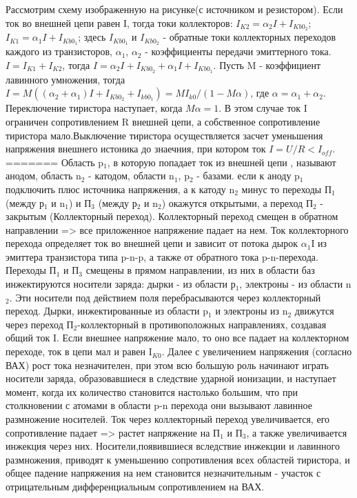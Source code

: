 Рассмотрим схему изображенную на рисунке(с источником и резистором). Если ток во внешней цепи равен I, тогда токи коллекторов:
$I_{K2} = \alpha_2I+I_{Kb0}_2$; $I_{K1} = \alpha_1I+I_{Kb0}_1$;
здесь $I_{Kb0}_1$ и $I_{Kb0}_2$ - обратные токи коллекторных переходов каждого из транзисторов, $\alpha_1$, $\alpha_2$ - коэффициенты передачи эмиттерного тока. $I = I_{K1}+I_{K2}$, тогда  $I = \alpha_2I+I_{Kb0}_2+\alpha_1I+I_{Kb0}_1$.
Пусть M - коэффициент лавинного умножения, тогда $I = M( (\alpha_2+\alpha_1)I+I_{Kb0}_2+I_{kb0}_1) = MI_{k0}/(1-M\alpha) $, где $\alpha = \alpha_1+\alpha_2$. Переключение тиристора наступает, когда $M\alpha = 1$. В этом случае ток I ограничен сопротивлением R внешней цепи, а собственное сопротивление тиристора мало.Выключение тиристора осуществляется засчет уменьшения напряжения внешнего истоника до знаечния, при котором ток $I=U/R < I_{off}$.
=======
Область p$_1$, в которую попадает ток из внешней цепи , называют анодом, область n$_2$  - катодом, области n$_1$, p$_2$ - базами. если к аноду p$_1$ подключить плюс источника напряжения, а к катоду n$_2$ минус то переходы П$_1$ (между р$_1$ и n$_1$) и  П$_3$ (между р$_2$ и n$_2$) окажутся открытыми, а переход П$_2$ - закрытым (Коллекторный переход). Коллекторный переход смещен в обратном направлении => все приложенное напряжение падает на нем. Ток коллекторного перехода определяет ток во внешней цепи и зависит от потока дырок $\alpha_1$I из эмиттера транзистора типа p-n-p, а также от обратного тока p-n-перехода. Переходы П$_1$ и П$_3$ смещены в прямом направлении, из них в области баз инжектируются носители заряда: дырки - из области р$_1$, электроны - из области n$_2$. Эти носители под действием поля перебрасываются через коллекторный переход. Дырки, инжектированные из области p$_1$ и электроны из n$_2$ движутся через переход П$_2$-коллекторный в противоположных направлениях, создавая общий ток I. Если внешнее напряжение мало, то оно все падает на коллекторном переходе, ток в цепи мал и равен I$_{K0}$. Далее с увеличением напряжения (согласно ВАХ) рост тока незначителен, при этом всю большую роль начинают играть носители заряда, образовавшиеся в следствие ударной ионизации, и наступает момент, когда их количество становится настолько большим, что при столкновении с атомами в области p-n перехода они вызывают лавинное размножение носителей. Ток через коллекторный переход увеличивается, его сопротивление падает => растет напряжение на П$_1$ и П$_3$, а также увеличивается инжекция через них. Носители,появившиеся вследствие инжекции и лавинного размножения, приводят к уменьшению сопротивления всех областей тиристора, и общее падение напряжения на нем становится незначительным - участок с отрицательным дифференциальным сопротивлением на ВАХ.

